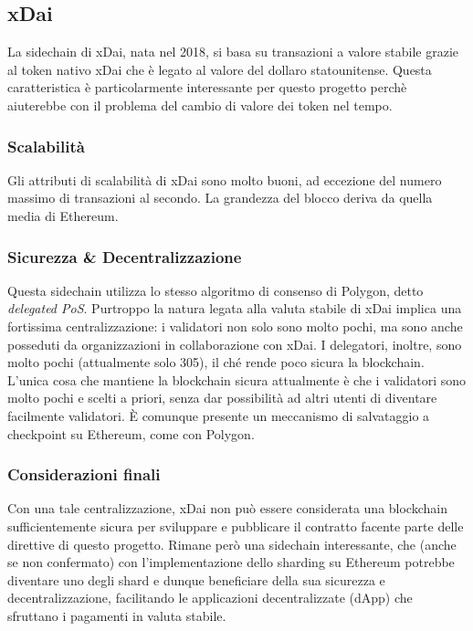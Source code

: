 \documentclass[a4paper, 12pt]{article}
\begin{document}
\newpage

\subsection*{xDai}
La sidechain di xDai, nata nel 2018, si basa su transazioni a valore stabile grazie al token nativo xDai che è legato al valore del dollaro statounitense.
Questa caratteristica è particolarmente interessante per questo progetto perchè aiuterebbe con il problema del cambio di valore dei token nel tempo.

\subsubsection*{Scalabilità}
Gli attributi di scalabilità di xDai sono molto buoni, ad eccezione del numero massimo di transazioni al secondo.
La grandezza del blocco deriva da quella media di Ethereum.

\subsubsection*{Sicurezza \& Decentralizzazione}
Questa sidechain utilizza lo stesso algoritmo di consenso di Polygon, detto \textit{delegated PoS}.
Purtroppo la natura legata alla valuta stabile di xDai implica una fortissima centralizzazione: i validatori non solo sono molto pochi, ma sono anche posseduti da organizzazioni
in collaborazione con xDai. I delegatori, inoltre, sono molto pochi (attualmente solo 305), il ché rende poco sicura la blockchain.
L'unica cosa che mantiene la blockchain sicura attualmente è che i validatori sono molto pochi e scelti a priori, senza dar possibilità ad altri utenti di diventare facilmente validatori.
È comunque presente un meccanismo di salvataggio a checkpoint su Ethereum, come con Polygon.

\subsubsection*{Considerazioni finali}
Con una tale centralizzazione, xDai non può essere considerata una blockchain sufficientemente sicura per sviluppare e pubblicare il contratto facente parte delle direttive di questo progetto. Rimane però una sidechain interessante, che (anche se non confermato) con l'implementazione dello sharding su Ethereum potrebbe diventare uno degli shard e dunque beneficiare della sua sicurezza e decentralizzazione, facilitando le applicazioni decentralizzate (dApp) che sfruttano i pagamenti in valuta stabile.
\end{document}
